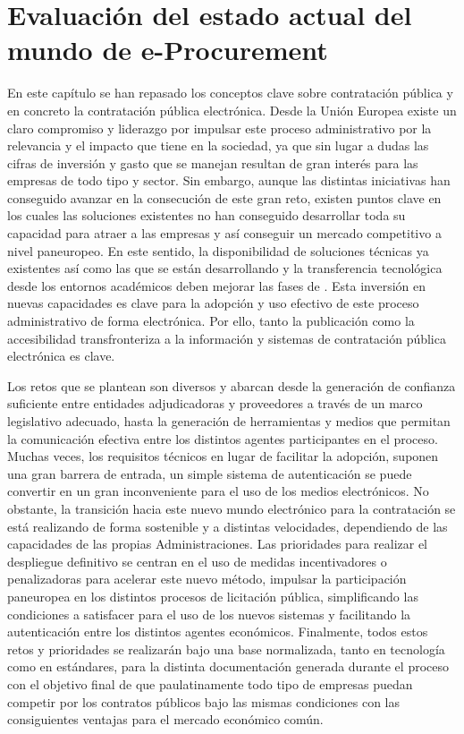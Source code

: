 \section{Evaluación del estado actual del mundo de e-Procurement}
En este capítulo se han repasado los conceptos clave sobre contratación
pública y en concreto la contratación pública electrónica. Desde la
Unión Europea existe un claro compromiso y liderazgo por impulsar este proceso
administrativo por la relevancia y el impacto que tiene en la sociedad, ya que sin lugar a dudas las cifras de inversión y gasto que se manejan
resultan de gran interés para las empresas de todo tipo y sector. Sin embargo, aunque las distintas iniciativas han conseguido avanzar en la 
consecución de este gran reto, existen puntos clave en los cuales las soluciones existentes no han
conseguido desarrollar toda su capacidad para atraer a las empresas
y así conseguir un mercado competitivo a nivel paneuropeo. En este sentido,
la disponibilidad de soluciones técnicas ya existentes así como las que
se están desarrollando y la transferencia tecnológica desde los entornos
académicos deben mejorar las fases de \eproc. Esta inversión
en nuevas capacidades es clave para la adopción y uso efectivo de este proceso administrativo
de forma electrónica. Por ello, tanto la publicación como la accesibilidad transfronteriza
a la información y sistemas de contratación pública electrónica es clave. 

Los retos que se plantean son diversos y abarcan desde la generación de confianza suficiente
entre entidades adjudicadoras y proveedores a través de un marco legislativo adecuado, hasta
la generación de herramientas y medios que permitan la comunicación efectiva entre los distintos
agentes participantes en el proceso. Muchas veces, los requisitos técnicos en lugar de facilitar
la adopción, suponen una gran barrera de entrada, un simple sistema de autenticación se puede
convertir en un gran inconveniente para el uso de los medios electrónicos. No obstante,
la transición hacia este nuevo mundo electrónico para la contratación se está realizando
de forma sostenible y a distintas velocidades, dependiendo de las capacidades de las propias
Administraciones. Las prioridades para realizar el despliegue definitivo se centran en el uso
de medidas incentivadores o penalizadoras para acelerar este nuevo método, impulsar
la participación paneuropea en los distintos procesos de licitación pública, simplificando 
las condiciones a satisfacer para el uso de los nuevos sistemas y facilitando la autenticación
entre los distintos agentes económicos. Finalmente, todos estos retos y prioridades se realizarán
bajo una base normalizada, tanto en tecnología como en estándares, para la distinta documentación
generada durante el proceso con el objetivo final de que paulatinamente todo tipo de empresas
puedan competir por los contratos públicos bajo las mismas condiciones con las consiguientes
ventajas para el mercado económico común.


